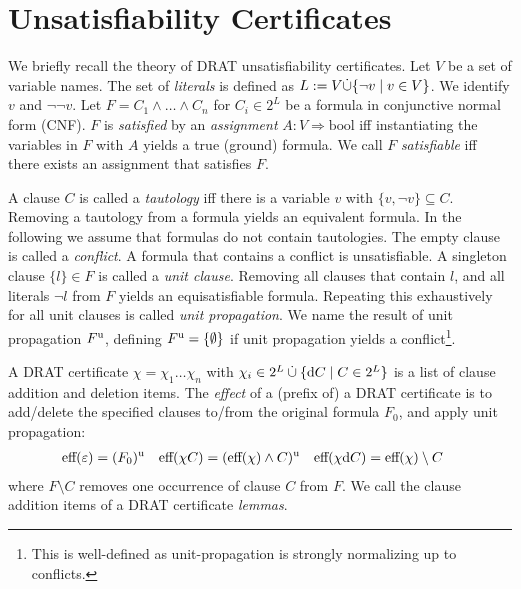 \documentclass[smallcondensed]{svjour3}     %
\begin{document}
\section{Unsatisfiability Certificates}\label{sec:unsat_cert}
We briefly recall the theory of DRAT unsatisfiability certificates. 
Let $V$ be a set of variable names. The set of \emph{literals} is defined as $L := V \dot{\cup} \{\neg v \mid v\in V \}$.
We identify $v$ and $\neg\neg v$.
Let $F = C_1 \wedge \ldots \wedge C_n$ for $C_i \in 2^L$ be a formula in conjunctive normal form (CNF). 
$F$ is \emph{satisfied} by an \emph{assignment} $A : V \Rightarrow \textrm{bool}$ iff instantiating the variables in $F$ with $A$ yields a true (ground) formula.
We call $F$ \emph{satisfiable} iff there exists an assignment that satisfies $F$.

A clause $C$ is called a \emph{tautology} iff there is a variable $v$ with $\{v,\neg v\} \subseteq C$. Removing a tautology from a formula yields an equivalent formula.
In the following we assume that formulas do not contain tautologies.
The empty clause is called a \emph{conflict}. A formula that contains a conflict is unsatisfiable. 
A singleton clause $\{l\} \in F$ is called a \emph{unit clause}. Removing all clauses that contain $l$, and all literals $\neg l$ from $F$ yields an equisatisfiable formula.
Repeating this exhaustively for all unit clauses is called \emph{unit propagation}. 
We name the result of unit propagation $F^{\textrm u}$, defining $F^{\textrm u} = \{\emptyset\}$ if unit propagation yields a conflict\footnote{This is well-defined as unit-propagation is strongly normalizing up to conflicts.}.

A DRAT certificate $\chi = \chi_1\ldots\chi_n$ with $\chi_i \in 2^L \mathbin{\dot\cup} \{ \textrm d C \mid C\in 2^L \}$
is a list of clause addition and deletion items.
The \emph{effect} of a (prefix of) a DRAT certificate is to add/delete the specified clauses to/from the original formula $F_0$, and apply unit propagation:
\begin{align*}
  \textrm{eff}(\varepsilon) &= (F_0)^\textrm{u}&
  \textrm{eff}(\chi C) &= (\textrm{eff}(\chi) \wedge C)^\textrm{u}&
  \textrm{eff}(\chi\textrm d C) &= \textrm{eff}(\chi) \setminus C
\end{align*}
where $F \setminus C$ removes one occurrence of clause $C$ from $F$. %
We call the clause addition items of a DRAT certificate \emph{lemmas}.
\end{document}
